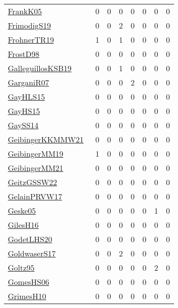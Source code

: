 {\begin{longtable}{l*{7}{r}}
\href{papers/FrankK05.pdf}{FrankK05}~\cite{FrankK05} & 0 & 0 & 0 & 0 & 0 & 0 & 0\\
\href{papers/FrimodigS19.pdf}{FrimodigS19}~\cite{FrimodigS19} & 0 & 0 & 2 & 0 & 0 & 0 & 0\\
\href{papers/FrohnerTR19.pdf}{FrohnerTR19}~\cite{FrohnerTR19} & 1 & 0 & 1 & 0 & 0 & 0 & 0\\
\href{papers/FrostD98.pdf}{FrostD98}~\cite{FrostD98} & 0 & 0 & 0 & 0 & 0 & 0 & 0\\
\href{papers/GalleguillosKSB19.pdf}{GalleguillosKSB19}~\cite{GalleguillosKSB19} & 0 & 0 & 1 & 0 & 0 & 0 & 0\\
\href{papers/GarganiR07.pdf}{GarganiR07}~\cite{GarganiR07} & 0 & 0 & 0 & 2 & 0 & 0 & 0\\
\href{papers/GayHLS15.pdf}{GayHLS15}~\cite{GayHLS15} & 0 & 0 & 0 & 0 & 0 & 0 & 0\\
\href{papers/GayHS15.pdf}{GayHS15}~\cite{GayHS15} & 0 & 0 & 0 & 0 & 0 & 0 & 0\\
\href{papers/GaySS14.pdf}{GaySS14}~\cite{GaySS14} & 0 & 0 & 0 & 0 & 0 & 0 & 0\\
\href{papers/GeibingerKKMMW21.pdf}{GeibingerKKMMW21}~\cite{GeibingerKKMMW21} & 0 & 0 & 0 & 0 & 0 & 0 & 0\\
\href{papers/GeibingerMM19.pdf}{GeibingerMM19}~\cite{GeibingerMM19} & 1 & 0 & 0 & 0 & 0 & 0 & 0\\
\href{papers/GeibingerMM21.pdf}{GeibingerMM21}~\cite{GeibingerMM21} & 0 & 0 & 0 & 0 & 0 & 0 & 0\\
\href{papers/GeitzGSSW22.pdf}{GeitzGSSW22}~\cite{GeitzGSSW22} & 0 & 0 & 0 & 0 & 0 & 0 & 0\\
\href{papers/GelainPRVW17.pdf}{GelainPRVW17}~\cite{GelainPRVW17} & 0 & 0 & 0 & 0 & 0 & 0 & 0\\
\href{papers/Geske05.pdf}{Geske05}~\cite{Geske05} & 0 & 0 & 0 & 0 & 0 & 1 & 0\\
\href{papers/GilesH16.pdf}{GilesH16}~\cite{GilesH16} & 0 & 0 & 0 & 0 & 0 & 0 & 0\\
\href{papers/GodetLHS20.pdf}{GodetLHS20}~\cite{GodetLHS20} & 0 & 0 & 0 & 0 & 0 & 0 & 0\\
\href{papers/GoldwaserS17.pdf}{GoldwaserS17}~\cite{GoldwaserS17} & 0 & 0 & 2 & 0 & 0 & 0 & 0\\
\href{papers/Goltz95.pdf}{Goltz95}~\cite{Goltz95} & 0 & 0 & 0 & 0 & 0 & 2 & 0\\
\href{papers/GomesHS06.pdf}{GomesHS06}~\cite{GomesHS06} & 0 & 0 & 0 & 0 & 0 & 0 & 0\\
\href{papers/GrimesH10.pdf}{GrimesH10}~\cite{GrimesH10} & 0 & 0 & 0 & 0 & 0 & 0 & 0\\

\end{longtable}}
